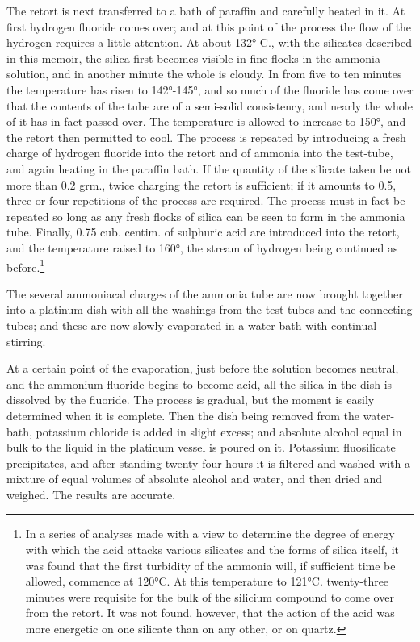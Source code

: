 \documentclass[a4paper, 12pt, oneside]{article}
\begin{document}
The retort is next transferred to a bath of paraffin and carefully heated in it. At first hydrogen fluoride comes over; and at this point of the process the flow of the hydrogen requires a little attention. At about 132° C., with the silicates described in this memoir, the silica first becomes visible in fine flocks in the ammonia solution, and in another minute the whole is cloudy. In from five to ten minutes the temperature has risen to 142°-145°, and so much of the fluoride has come over that the contents of the tube are of a semi-solid consistency, and nearly the whole of it has in fact passed over. The temperature is allowed to increase to 150°, and the retort then permitted to cool. The process is repeated by introducing a fresh charge of hydrogen fluoride into the retort and of ammonia into the test-tube, and again heating in the paraffin bath. If the quantity of the silicate taken be not more than 0.2 grm., twice charging the retort is sufficient; if it amounts to 0.5, three or four repetitions of the process are required. The process must in fact be repeated so long as any fresh flocks of silica can be seen to form in the ammonia tube. Finally, 0.75 cub. centim. of sulphuric acid are introduced into the retort, and the temperature raised to 160°, the stream of hydrogen being continued as before.\footnote{In a series of analyses made with a view to determine the degree of energy with which the acid attacks various silicates and the forms of silica itself, it was found that the first turbidity of the ammonia will, if sufficient time be allowed, commence at 120°C. At this temperature to 121°C. twenty-three minutes were requisite for the bulk of the silicium compound to come over from the retort. It was not found, however, that the action of the acid was more energetic on one silicate than on any other, or on quartz.}

The several ammoniacal charges of the ammonia tube are now brought together into a platinum dish with all the washings from the test-tubes and the connecting tubes; and these are now slowly evaporated in a water-bath with continual stirring.

At a certain point of the evaporation, just before the solution becomes neutral, and the ammonium fluoride begins to become acid, all the silica in the dish is dissolved by the fluoride. The process is gradual, but the moment is easily determined when it is complete. Then the dish being removed from the water-bath, potassium chloride is added in slight excess; and absolute alcohol equal in bulk to the liquid in the platinum vessel is poured on it. Potassium fluosilicate precipitates, and after standing twenty-four hours it is filtered and washed with a mixture of equal volumes of absolute alcohol and water, and then dried and weighed. The results are accurate.
\end{document}
